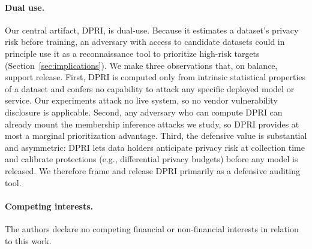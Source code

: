 \paragraph{Dual use.}
Our central artifact, DPRI, is dual-use. Because it estimates a dataset's
privacy risk before training, an adversary with access to candidate
datasets could in principle use it as a reconnaissance tool to prioritize
high-risk targets (Section~\ref{sec:implications}). We make three
observations that, on balance, support release. First, DPRI is computed
only from intrinsic statistical properties of a dataset and confers no
capability to attack any specific deployed model or service. Our
experiments attack no live system, so no vendor vulnerability disclosure is
applicable. Second, any adversary who can compute DPRI can already mount the
membership inference attacks we study, so DPRI provides at most a marginal
prioritization advantage. Third, the defensive value is substantial and
asymmetric: DPRI lets data holders anticipate privacy risk at collection
time and calibrate protections (e.g., differential privacy budgets) before
any model is released. We therefore frame and release DPRI primarily as a
defensive auditing tool.

\paragraph{Competing interests.}
The authors declare no competing financial or non-financial interests in
relation to this work.
